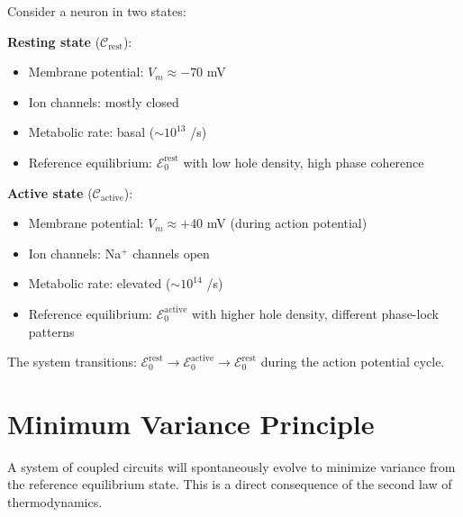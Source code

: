 \begin{example}
Consider a neuron in two states:

\textbf{Resting state} ($\mathcal{C}_{\text{rest}}$):
\begin{itemize}
\item Membrane potential: $V_m \approx -70$ mV
\item Ion channels: mostly closed
\item Metabolic rate: basal ($\sim 10^{13}$ /s)
\item Reference equilibrium: $\mathcal{E}_0^{\text{rest}}$ with low hole density, high phase coherence
\end{itemize}

\textbf{Active state} ($\mathcal{C}_{\text{active}}$):
\begin{itemize}
\item Membrane potential: $V_m \approx +40$ mV (during action potential)
\item Ion channels: Na$^+$ channels open
\item Metabolic rate: elevated ($\sim 10^{14}$ /s)
\item Reference equilibrium: $\mathcal{E}_0^{\text{active}}$ with higher hole density, different phase-lock patterns
\end{itemize}

The system transitions: $\mathcal{E}_0^{\text{rest}} \to \mathcal{E}_0^{\text{active}} \to \mathcal{E}_0^{\text{rest}}$ during the action potential cycle.
\end{example}

\section{Minimum Variance Principle}


\begin{theorem}
\label{thm:variance_necessity}
A system of coupled circuits will spontaneously evolve to minimize variance from the reference equilibrium state. This is a direct consequence of the second law of thermodynamics.
\end{theorem}

